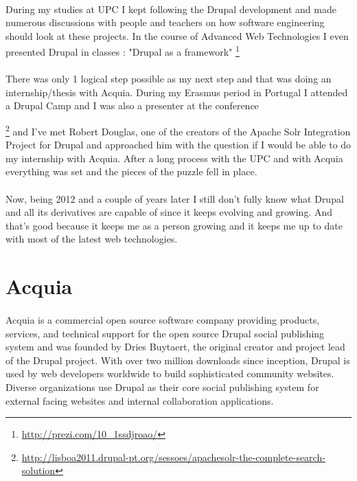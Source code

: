 \paragraph{}
During my studies at UPC I kept following the Drupal development and made numerous discussions with people and teachers on how software engineering should look at these projects. In the course of Advanced Web Technologies I even presented Drupal in classes : "Drupal as a framework" \footnote{\url{http://prezi.com/10_1ssdjroao/}}
\paragraph{}
There was only 1 logical step possible as my next step and that was doing an internship/thesis with Acquia. During my Erasmus period in Portugal I attended a Drupal Camp and I was also a presenter at the conference {\footnote{\url{http://lisboa2011.drupal-pt.org/sessoes/apachesolr-the-complete-search-solution}} and I've met Robert Douglas, one of the creators of the Apache Solr Integration Project for Drupal and approached him with the question if I would be able to do my internship with Acquia. After a long process with the UPC and with Acquia everything was set and the pieces of the puzzle fell in place.
\paragraph{}
Now,  being 2012 and a couple of years later I still don't fully know what Drupal and all its derivatives are capable of since it keeps evolving and growing. And that's good because it keeps me as a person growing and it keeps me up to date with most of the latest web technologies.

\section{Acquia}
\paragraph{} 
Acquia is a commercial open source software company providing products, services, and technical support for the open source Drupal social publishing system and was founded by Dries Buytaert, the original creator and project lead of the Drupal project. With over two million downloads since inception, Drupal is used by web developers worldwide to build sophisticated community websites. Diverse organizations use Drupal as their core social publishing system for external facing websites and internal collaboration applications.

}
